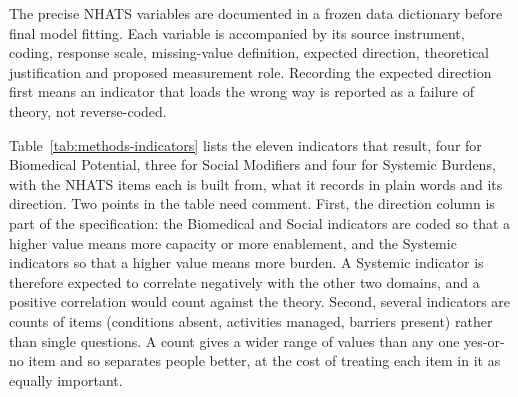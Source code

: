 The precise NHATS variables are documented in a frozen data dictionary before final model fitting. Each variable is accompanied by its source instrument, coding, response scale, missing-value definition, expected direction, theoretical justification and proposed measurement role. Recording the expected direction first means an indicator that loads the wrong way is reported as a failure of theory, not reverse-coded.

Table~\ref{tab:methods-indicators} lists the eleven indicators that result, four for Biomedical Potential, three for Social Modifiers and four for Systemic Burdens, with the NHATS items each is built from, what it records in plain words and its direction. Two points in the table need comment. First, the direction column is part of the specification: the Biomedical and Social indicators are coded so that a higher value means more capacity or more enablement, and the Systemic indicators so that a higher value means more burden. A Systemic indicator is therefore expected to correlate negatively with the other two domains, and a positive correlation would count against the theory. Second, several indicators are counts of items (conditions absent, activities managed, barriers present) rather than single questions. A count gives a wider range of values than any one yes-or-no item and so separates people better, at the cost of treating each item in it as equally important.

